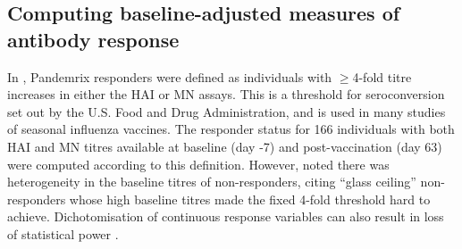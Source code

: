 \subsection{Computing baseline-adjusted measures of antibody response}

In \autocite{sobolev2016AdjuvantedInfluenzaH1N1Vaccination}, Pandemrix responders were defined as individuals with $\ge$4-fold titre increases in either the \gls{HAI} or \gls{MN} assays.
This is a threshold for seroconversion set out by the U.S. Food and Drug Administration\autocite{foodanddrugadministration2007GuidanceIndustryClinical}, and is used in many studies of seasonal influenza vaccines\autocite{hagan2015SystemsVaccinologyEnabling}.
The responder status for 166 individuals with both \gls{HAI} and \gls{MN} titres available at baseline (day -7) and post-vaccination (day 63) were computed according to this definition.
However, \autocite{sobolev2016AdjuvantedInfluenzaH1N1Vaccination} noted there was heterogeneity in the baseline titres of non-responders, citing \enquote{glass ceiling} non-responders whose high baseline titres made the fixed 4-fold threshold hard to achieve.
Dichotomisation of continuous response variables can also result in loss of statistical power \autocite{cohen1983CostDichotomization, fedorov2009ConsequencesDichotomization}.

